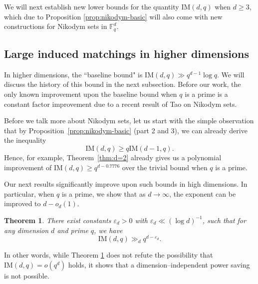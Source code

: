 \documentclass[12pt,reqno]{amsart}
\theoremstyle{plain}
\newtheorem{theorem}{Theorem}[section]
\theoremstyle{definition}
\newcommand{\IM}{\mathrm{IM}}
\newcommand{\1}{\mathbf{1}}
\begin{document}
We will next establish new lower bounds for the quantity $\IM(d,q)$ when $d \geq 3$, which due to Proposition \ref{prop:nikodym-basic} will also come with new constructions for Nikodym sets in $\mathbb{F}_{q}^{d}$. 

\subsection{Large induced matchings in higher dimensions}

In higher dimensions, the ``baseline bound" is $\IM(d,q)\gg q^{d - 1}\log q$. We will discuss the history of this bound in the next subsection. Before our work, the only known improvement upon the baseline bound when $q$ is a prime is a constant factor improvement due to a recent result of Tao \cite{Tao2025} on Nikodym sets. 

Before we talk more about Nikodym sets, let us start with the simple observation that by Proposition~\ref{prop:nikodym-basic} (part 2 and 3), we can already derive the inequality
\begin{equation} \label{eq:IMlift}
    \IM(d, q) \geq q \IM(d - 1, q).
\end{equation}
Hence, for example, Theorem~\ref{thm:d=2} already gives us a polynomial improvement of $\IM(d, q) \geq q^{d - 0.7776}$ over the trivial bound when $q$ is a prime.

Our next results significantly improve upon such bounds in high dimensions. In particular, when $q$ is a prime, we show that as $d \to \infty$, the exponent can be improved to $d - o_d(1)$.
\begin{theorem}
    \label{thm:prime-high-dim}
    There exist constants $\varepsilon_d > 0$ with $\varepsilon_d \ll (\log d)^{-1}$, such that for any dimension $d$ and prime $q$, we have
    $$\IM(d, q) \gg_d q^{d - \varepsilon_d}.$$
\end{theorem}
In other words, while Theorem \ref{thm:prime-high-dim} does not refute the possibility that $\IM(d, q) = o(q^d)$ holds, it shows that a dimension--independent power saving is not possible. 

\medskip
\end{document}
